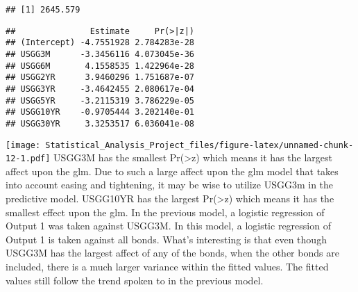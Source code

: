 \documentclass[]{article}
\newenvironment{Shaded}{\begin{snugshade}}{\end{snugshade}}
\newcommand{\KeywordTok}[1]{\textcolor[rgb]{0.13,0.29,0.53}{\textbf{#1}}}
\newcommand{\DataTypeTok}[1]{\textcolor[rgb]{0.13,0.29,0.53}{#1}}
\newcommand{\DecValTok}[1]{\textcolor[rgb]{0.00,0.00,0.81}{#1}}
\newcommand{\StringTok}[1]{\textcolor[rgb]{0.31,0.60,0.02}{#1}}
\newcommand{\OperatorTok}[1]{\textcolor[rgb]{0.81,0.36,0.00}{\textbf{#1}}}
\newcommand{\NormalTok}[1]{#1}
\begin{document}
\begin{verbatim}
## [1] 2645.579
\end{verbatim}

\begin{Shaded}
\end{Shaded}

\begin{verbatim}
##               Estimate     Pr(>|z|)
## (Intercept) -4.7551928 2.784283e-28
## USGG3M      -3.3456116 4.073045e-36
## USGG6M       4.1558535 1.422964e-28
## USGG2YR      3.9460296 1.751687e-07
## USGG3YR     -3.4642455 2.080617e-04
## USGG5YR     -3.2115319 3.786229e-05
## USGG10YR    -0.9705444 3.202140e-01
## USGG30YR     3.3253517 6.036041e-08
\end{verbatim}

\begin{Shaded}
\end{Shaded}

\texttt{[image: Statistical\_Analysis\_Project\_files/figure-latex/unnamed-chunk-12-1.pdf]}
USGG3M has the smallest Pr(\textgreater{}\textbar{}z\textbar{}) which
means it has the largest affect upon the glm. Due to such a large affect
upon the glm model that takes into account easing and tightening, it may
be wise to utilize USGG3m in the predictive model. USGG10YR has the
largest Pr(\textgreater{}\textbar{}z\textbar{}) which means it has the
smallest effect upon the glm. In the previous model, a logistic
regression of Output 1 was taken against USGG3M. In this model, a
logistic regression of Output 1 is taken against all bonds. What's
interesting is that even though USGG3M has the largest affect of any of
the bonds, when the other bonds are included, there is a much larger
variance within the fitted values. The fitted values still follow the
trend spoken to in the previous model.
\end{document}
